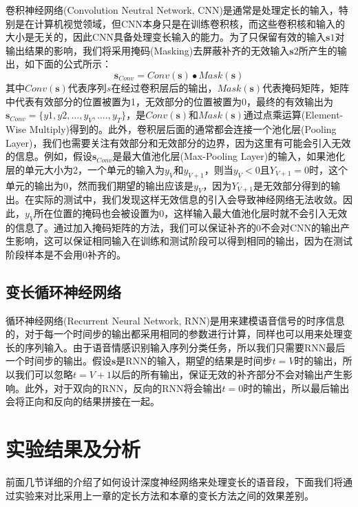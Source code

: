 卷积神经网络(Convolution Neutral Network, CNN)是通常是处理定长的输入，特别是在计算机视觉领域，但CNN本身只是在训练卷积核，而这些卷积核和输入的大小是无关的，因此CNN具备处理变长输入的能力。为了只保留有效的输入$\mathbf{s}1$对输出结果的影响，我们将采用掩码(Masking)去屏蔽补齐的无效输入$\mathbf{s}2$所产生的输出，如下面的公式所示：
\begin{equation}
\label{equ:cnn_mask}
    \mathbf{s}_{Conv} = Conv(\mathbf{s}) \bullet Mask(\mathbf{s})
\end{equation}
其中$Conv(\mathbf{s})$代表序列$s$在经过卷积层后的输出，$Mask(\mathbf{s})$代表掩码矩阵，矩阵中代表有效部分的位置被置为1，无效部分的位置被置为0，最终的有效输出为$\mathbf{s}_{Conv}=\{y1,y2,...,y_V,....,y_T\}$，是$Conv(\mathbf{s})$和$Mask(\mathbf{s})$通过点乘运算(Element-Wise Multiply)得到的。此外，卷积层后面的通常都会连接一个池化层(Pooling Layer)，我们也需要关注有效部分和无效部分的边界，因为这里有可能会引入无效的信息。例如，假设$\mathbf{s}_{Conv}$是最大值池化层(Max-Pooling Layer)的输入，如果池化层的单元大小为2，一个单元的输入为$y_V$和$y_{V+1}$，则当$y_V<0$且$Y_{V+1}=0$时，这个单元的输出为0，然而我们期望的输出应该是$y_V$，因为$Y_{V+1}$是无效部分得到的输出。在实际的测试中，我们发现这样无效信息的引入会导致神经网络无法收敛。因此，$y_V$所在位置的掩码也会被设置为0，这样输入最大值池化层时就不会引入无效的信息了。通过加入掩码矩阵的方法，我们可以保证补齐的0不会对CNN的输出产生影响，这可以保证相同输入在训练和测试阶段可以得到相同的输出，因为在测试阶段样本是不会用0补齐的。

\subsection{变长循环神经网络}
\label{ssec:var_len_rnn}

循环神经网络(Recurrent Neural Network, RNN)是用来建模语音信号的时序信息的，对于每一个时间步的输出都采用相同的参数进行计算，同样也可以用来处理变长的序列输入。由于语音情感识别输入序列分类任务，所以我们只需要RNN最后一个时间步的输出。假设$\mathbf{s}$是RNN的输入，期望的结果是时间步$t=V$时的输出，所以我们可以忽略$t=V+1$以后的所有输出，保证无效的补齐部分不会对输出产生影响。此外，对于双向的RNN，反向的RNN将会输出$t=0$时的输出，所以最后输出会将正向和反向的结果拼接在一起。

\section{实验结果及分析}
\label{sec:var_len_experiment}

前面几节详细的介绍了如何设计深度神经网络来处理变长的语音段，下面我们将通过实验来对比采用上一章的定长方法和本章的变长方法之间的效果差别。

